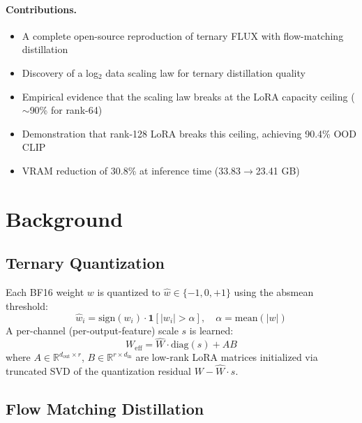 \documentclass[10pt,twocolumn]{article}
\begin{document}
\paragraph{Contributions.}
\begin{itemize}[nosep,leftmargin=*]
  \item A complete open-source reproduction of ternary FLUX with flow-matching distillation
  \item Discovery of a log$_2$ data scaling law for ternary distillation quality
  \item Empirical evidence that the scaling law breaks at the LoRA capacity ceiling ($\sim$90\% for rank-64)
  \item Demonstration that rank-128 LoRA breaks this ceiling, achieving 90.4\% OOD CLIP
  \item VRAM reduction of 30.8\% at inference time (33.83$\to$23.41 GB)
\end{itemize}

\section{Background}

\subsection{Ternary Quantization}

Each BF16 weight $w$ is quantized to $\hat{w} \in \{-1, 0, +1\}$ using the absmean threshold:
\begin{equation}
  \hat{w}_i = \text{sign}(w_i) \cdot \mathbf{1}[|w_i| > \alpha], \quad \alpha = \text{mean}(|w|)
\end{equation}
A per-channel (per-output-feature) scale $s$ is learned:
\begin{equation}
  W_{\text{eff}} = \hat{W} \cdot \text{diag}(s) + A B
\end{equation}
where $A \in \mathbb{R}^{d_{\text{out}} \times r}$, $B \in \mathbb{R}^{r \times d_{\text{in}}}$ are low-rank LoRA matrices initialized via truncated SVD of the quantization residual $W - \hat{W} \cdot s$.

\subsection{Flow Matching Distillation}
\end{document}
